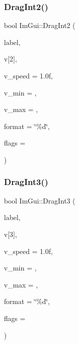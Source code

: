 \mbox{\label{namespaceImGui_a56e3ba8164b0b78b46f01a3a2f7fe00b}} 
\subsubsection{\texorpdfstring{Drag\+Int2()}{DragInt2()}}
{\footnotesize\ttfamily bool Im\+Gui\+::\+Drag\+Int2 (\begin{DoxyParamCaption}\item[{const char $\ast$}]{label,  }\item[{int}]{v\mbox{[}2\mbox{]},  }\item[{float}]{v\+\_\+speed = {\ttfamily 1.0f},  }\item[{int}]{v\+\_\+min = {},  }\item[{int}]{v\+\_\+max = {},  }\item[{const char $\ast$}]{format = {\ttfamily \char`\"{}\%d\char`\"{}},  }\item[{Im\+Gui\+Slider\+Flags}]{flags = {} }\end{DoxyParamCaption})}

\mbox{\label{namespaceImGui_af4be377242ba2480b28b116390af7261}} 
\subsubsection{\texorpdfstring{Drag\+Int3()}{DragInt3()}}
{\footnotesize\ttfamily bool Im\+Gui\+::\+Drag\+Int3 (\begin{DoxyParamCaption}\item[{const char $\ast$}]{label,  }\item[{int}]{v\mbox{[}3\mbox{]},  }\item[{float}]{v\+\_\+speed = {\ttfamily 1.0f},  }\item[{int}]{v\+\_\+min = {},  }\item[{int}]{v\+\_\+max = {},  }\item[{const char $\ast$}]{format = {\ttfamily \char`\"{}\%d\char`\"{}},  }\item[{Im\+Gui\+Slider\+Flags}]{flags = {} }\end{DoxyParamCaption})}

\mbox{\label{namespaceImGui_a5d75e4d3263272f22eb2001652397e55}} 
